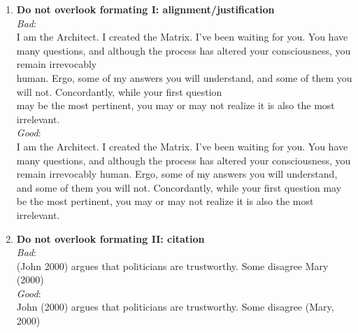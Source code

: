 \documentclass[a4paper]{article}
\begin{document}
\begin{enumerate}
\item \textbf{Do not overlook formating I: alignment/justification}\\
\textit{Bad}:\\
 I am the Architect. I created the Matrix. I've been waiting for you. You have many questions, and although the process has altered your consciousness, you remain irrevocably \\
 human. Ergo, some of my answers you will understand, and some of them you will not. Concordantly, while your first question \\
 may be the most pertinent, you may or may not realize it is also the most irrelevant.\\
\textit{Good}:\\
I am the Architect. I created the Matrix. I've been waiting for you. You have many questions, and although the process has altered your consciousness, you remain irrevocably human. Ergo, some of my answers you will understand, and some of them you will not. Concordantly, while your first question may be the most pertinent, you may or may not realize it is also the most irrelevant.
\item \textbf{Do not overlook formating II: citation}\\
\textit{Bad}:\\
(John 2000) argues that politicians are trustworthy. Some disagree Mary (2000)\\
\textit{Good}:\\
John (2000) argues that politicians are trustworthy. Some disagree (Mary, 2000)
\end{enumerate}
\end{document}
